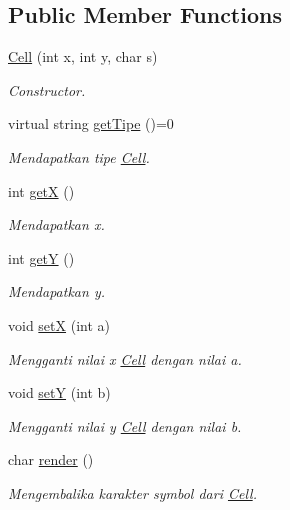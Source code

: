 \subsection*{Public Member Functions}
\begin{DoxyCompactItemize}
\item 
\hyperlink{classCell_a2cdce2f976b12fb50d1b9ca10c7e3b7d}{Cell} (int x, int y, char s)
\begin{DoxyCompactList}\small\item\em Constructor. \end{DoxyCompactList}\item 
virtual string \hyperlink{classCell_acf75f66796e8746df81dec0f7700ebbc}{get\-Tipe} ()=0
\begin{DoxyCompactList}\small\item\em Mendapatkan tipe \hyperlink{classCell}{Cell}. \end{DoxyCompactList}\item 
int \hyperlink{classCell_aab1e15a21ebcf0264bb79ec70224289c}{get\-X} ()
\begin{DoxyCompactList}\small\item\em Mendapatkan x. \end{DoxyCompactList}\item 
int \hyperlink{classCell_aa3afa71b2bb12f59bec1a06ffb3d4b5a}{get\-Y} ()
\begin{DoxyCompactList}\small\item\em Mendapatkan y. \end{DoxyCompactList}\item 
void \hyperlink{classCell_a5f610c860182564a7772d092204bc72d}{set\-X} (int a)
\begin{DoxyCompactList}\small\item\em Mengganti nilai x \hyperlink{classCell}{Cell} dengan nilai a. \end{DoxyCompactList}\item 
void \hyperlink{classCell_afe18f178541bac6004586866f2fb684c}{set\-Y} (int b)
\begin{DoxyCompactList}\small\item\em Mengganti nilai y \hyperlink{classCell}{Cell} dengan nilai b. \end{DoxyCompactList}\item 
char \hyperlink{classCell_a1fc51c6f42b94d1e55f41f068846f523}{render} ()
\begin{DoxyCompactList}\small\item\em Mengembalika karakter symbol dari \hyperlink{classCell}{Cell}. \end{DoxyCompactList}\end{DoxyCompactItemize}


